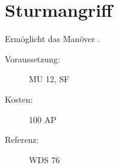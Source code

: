 \section{Sturmangriff}
\label{sf.sturmangriff}
Ermöglicht das Manöver .
\begin{description}
    \item[Voraussetzung:]
        MU 12, SF 
    \item [Kosten:]
        100 AP
    \item [Referenz:]
        WDS 76
\end{description}
